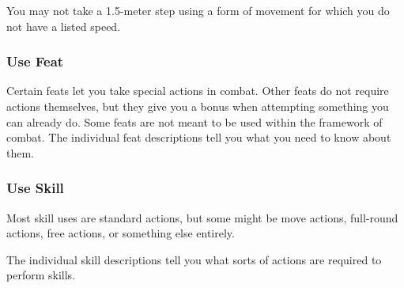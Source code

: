You may not take a 1.5-meter step using a form of movement for which you do not have a listed speed.

\subsubsection{Use Feat}
Certain feats let you take special actions in combat. Other feats do not require actions themselves, but they give you a bonus when attempting something you can already do. Some feats are not meant to be used within the framework of combat. The individual feat descriptions tell you what you need to know about them.

\subsubsection{Use Skill}
Most skill uses are standard actions, but some might be move actions, full-round actions, free actions, or something else entirely.

The individual skill descriptions tell you what sorts of actions are required to perform skills.
